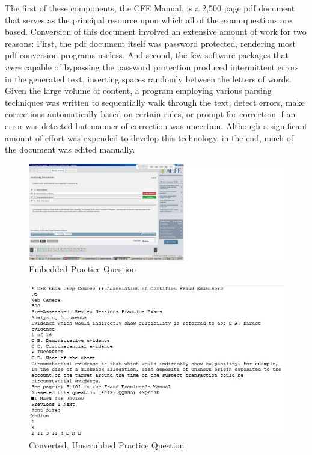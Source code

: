 The first of these components, the CFE Manual, is a 2,500 page pdf document that serves as the principal resource upon which all of the exam questions are based.  Conversion of this document involved an extensive amount of work for two reasons:  First, the pdf document itself was password protected, rendering most pdf conversion programs useless.  And second, the few software packages that \textit{were} capable of bypassing the password protection produced intermittent errors in the generated text, inserting spaces randomly between the letters of words.  Given the large volume of content, a program employing various parsing techniques was written to sequentially walk through the text, detect errors, make corrections automatically based on certain rules, or prompt for correction if an error was detected but manner of correction was uncertain.  Although a significant amount of effort was expended to develop this technology, in the end, much of the document was edited manually.  

\begin{figure}
\centering
\vspace{2.0in}
\includegraphics[width=200mm]{study_package_screen_shot.jpg}
\caption{Embedded Practice Question}
\label{fig:study_package_screen_shot}
\end{figure}

\begin{figure}
\centering
\vspace{2.0in}
\includegraphics[scale=0.75]{study_package_unformatted_text.jpg}
\caption{Converted, Unscrubbed Practice Question}
\label{fig:study_package_unformatted_text}
\end{figure}

